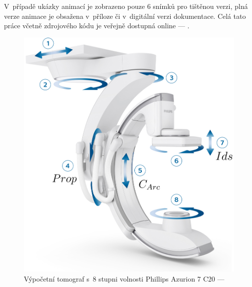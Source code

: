 V~případě ukázky animací je zobrazeno pouze 6 snímků pro tištěnou verzi, plná verze animace je obsažena v~příloze či v~digitální verzi dokumentace. Celá tato práce včetně zdrojového kódu je veřejně dostupná online --- \cite{Github}.
\begin{figure}[H]
    \centering
    \includegraphics[width=\textwidth]{Img/Azurion 7 C20 with FlexArm modified.png}
    \caption[Výpočetní tomograf s~8 stupni volnosti Phillips Azurion 7 C20]{Výpočetní tomograf s~8 stupni volnosti Phillips Azurion 7 C20 --- \cite{Azurion}}
    \label{fig:Výpočetní tomograf}
\end{figure}
